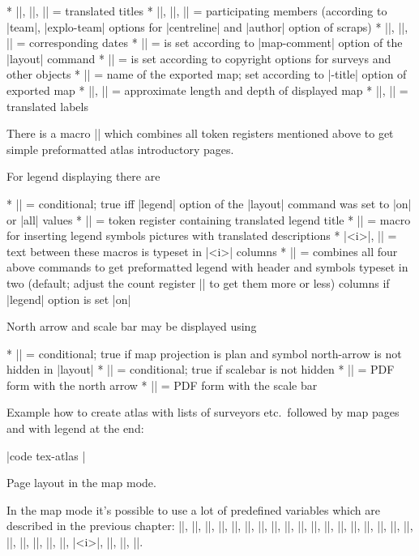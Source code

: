 \list
* |\explotitle|, |\topotitle|, |\cartotitle| = translated titles
* |\exploteam|, |\topoteam|, |\cartoteam| = participating members 
  (according to |team|, |explo-team| options for |centreline| and |author|
  option of scraps)
* |\explodate|, |\topodate|, |\cartodate| = corresponding dates 
* |\comment| = is set according to |map-comment| option of the |layout|
  command
* |\copyrights| = is set according to copyright options for surveys and other
  objects
* |\cavename| = name of the exported map; set according to |-title| option
  of exported map
* |\cavelength|, |\cavedepth| = approximate length and depth of displayed map
* |\cavelengthtitle|, |\cavedepthtitle| = translated labels
\endlist

There is a macro |\atlastitlepages| which combines all token registers 
mentioned above to get simple preformatted atlas introductory pages.

For legend displaying there are

\list
* |\iflegend| = conditional; true iff |legend| option of the |layout| command
  was set to |on| or |all| values
* |\legendtitle| = token register containing translated legend title
* |\insertlegend| = macro for inserting legend symbols pictures with translated
  descriptions
* |\begmulti <i>|, |\endmulti| = text between these macros is typeset in
  |<i>| columns
* |\formattedlegend| = combines all four above commands to get
  preformatted legend with header and symbols typeset in two   (default; 
  adjust the count register |\legendcolumns| to get them more or less)
  columns if |legend| option is set |on|
\endlist

North arrow and scale bar may be displayed using

\list
* |\ifnortharrow| = conditional; true if map projection is plan and
  symbol north-arrow is not hidden in |layout|
* |\ifscalebar| = conditional; true if scalebar is not hidden
* |\northarrow| = PDF form with the north arrow
* |\scalebar| = PDF form with the scale bar
\endlist

Example how to create atlas with lists of surveyors etc.\ followed by map pages 
and with legend at the end:

|code tex-atlas
  \atlastitlepages
  \insertmaps
  \formattedlegend|

\subchapter Page layout in the map mode.

In the map mode it's possible to use a lot of predefined variables which 
are described in the previous chapter: 
|\cavename|, |\comment|, |\copyrights|, 
|\explotitle|, |\topotitle|, |\cartotitle|, 
|\exploteam|, |\topoteam|, |\cartoteam|, 
|\explodate|, |\topodate|, |\cartodate|, 
|\cavelength|, |\cavedepth|, |\cavelengthtitle|, |\cavedepthtitle|,
|\ifnortharrow|, |\ifscalebar|, |\northarrow|, |\scalebar|, 
|\iflegend|, |\legendtitle|, |\insertlegend|, |\begmulti <i>|, |\endmulti|, 
|\formattedlegend|, |\legendcolumns|.


